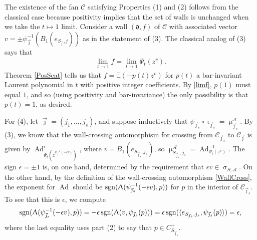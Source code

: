 \documentclass{amsart}
\DeclareMathOperator{\sign}{sgn}
\DeclareMathOperator{\Ad}{Ad}
\let\bb=\mathbb
\let\rar=\rightarrow
\let\f=\mathfrak
\let\s=\mathcal
\newcommand {\jj} {\vec{\jmath}}
\renewcommand{\iota}{\upiota}
\renewcommand{\sigma}{\upsigma}
\renewcommand{\Lambda}{\Uplambda}
\renewcommand{\mu}{\upmu}
\theoremstyle{plain}%
\theoremstyle{definition}
\theoremstyle{remark}
\newenvironment{myproof}[1][\proofname]{\proof[#1]\mbox{}}{\endproof}
\begin{document}
\begin{myproof}[Proof of Proposition \ref{Chambers}]
The existence of the fan $\s{C}$ satisfying Properties (1) and (2) follows from the classical case \cite[Construction 1.30]{GHKK} because positivity implies that the set of walls is unchanged when we take the $t\mapsto 1$ limit.  Consider a wall $(\f{d},f)$ of $\s{C}$ with associated vector $v = \pm \psi_{\jj}^{-1}(B_1(e_{S_{\jj},j}))$ as in the statement of (3).  The classical analog of (3) says that
\begin{align}\label{limf}
    \lim_{t\rar 1} f = \lim_{t\rar 1} \Psi_t(z^{v}).
\end{align}  
Theorem \ref{PosScat} tells us that $f=\bb{E}(-p(t)z^{v})$ for $p(t)$ a bar-invariant Laurent polynomial in $t$ with positive integer coefficients.  By \eqref{limf}, $p(1)$ must equal $1$, and so (using positivity and bar-invariance) the only possibility is that $p(t)=1$, as desired.

For (4), let $\jj=(j_1,\ldots,j_s)$, and suppose inductively that $\psi_{\jj_s}\circ \iota_{\jj_s}=\mu^{\s{A}}_{\jj_s}$.  By (3), we know that the wall-crossing automorphism for crossing from $\s{C}_{\jj_s}$ to $\s{C}_{\jj}$ is given by $\Ad^{\epsilon}_{ \Psi_t(z^{\psi_{\jj}^{-1}(-\epsilon v)})}$, where $v=B_1(e_{S_{\jj_s},j_s})$, so $\mu^{\s{A}}_{S_{\jj_s},j_s}=\Ad^{-1}_{\Psi_t(z^v)}$.  The sign $\epsilon=\pm 1$ is, on one hand, determined by the requirement that $\epsilon v\in \sigma_{S,\s{A}}$.  On the other hand, by the definition of the wall-crossing automorphism \eqref{WallCross}, the exponent for $\Ad$ should be $\sign(\Lambda(\psi_{\jj_s}^{-1}(-\epsilon v),p))$ for $p$ in the interior of $\s{C}_{\jj_s}$.  To see that this is $\epsilon$, we compute
\begin{align*}
    \sign(\Lambda(\psi_{\jj_s}^{-1}(-\epsilon v),p))=-\epsilon \sign(\Lambda(v,\psi_{\jj_s}(p))) = \epsilon \sign(\langle e_{S_{\jj_s},j_s}, \psi_{\jj_s}(p)\rangle)=\epsilon,
\end{align*}
where the last equality uses part (2) to say that $p\in C_{S_{\jj_s}}^+$.


\end{myproof}
\end{document}
